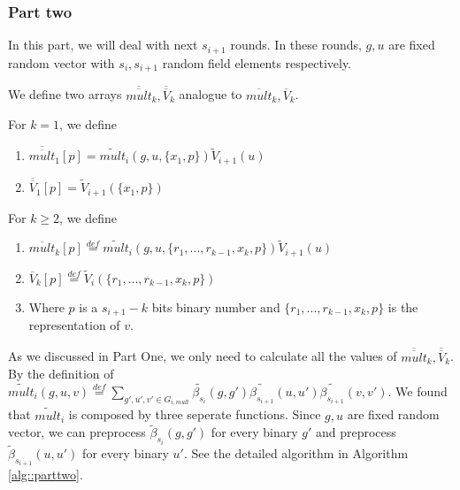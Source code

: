 \subsubsection{Part two}
In this part, we will deal with next $s_{i+1}$ rounds. In these rounds, $g, u$ are fixed random vector with $s_{i}, s_{i+1}$ random field elements respectively.

We define two arrays $\overline{\overline{mult}}_k, \overline{\overline{V}}_k$ analogue to $\overline{mult}_k, \overline{V}_k$.

\begin{definition}
	For $k=1$, we define 
	\begin{enumerate}
		\item $\overline{\overline{mult}}_1[p] = \tilde{mult}_i(g, u, \{x_1, p\})\tilde{V}_{i+1}(u)$
		\item $\overline{\overline{V}}_1[p] = \tilde{V}_{i+1}(\{x_1, p\})$
	\end{enumerate}
	For $k\ge 2$, we define
	\begin{enumerate}
		\item $\overline{mult}_k[p]\overset{def}{=}\tilde{mult}_i(g, u, \{r_1, ..., r_{k-1}, x_k, p\})\tilde{V}_{i+1}(u)$
		\item $\overline{V}_k[p]\overset{def}{=}\tilde{V}_i(\{r_1, ..., r_{k-1}, x_k, p\})$
		\item Where $p$ is a $s_{i+1}-k$ bits binary number and $\{r_1, ..., r_{k-1}, x_k, p\}$ is the representation of $v$.
	\end{enumerate}
\end{definition}

As we discussed in Part One, we only need to calculate all the values of $\overline{\overline{mult}}_k, \overline{\overline{V}}_k$. By the definition of $\tilde{mult}_i(g, u, v)\overset{def}{=}\sum_{g', u', v' \in G_{i, mult}}\tilde{\beta_{s_i}}(g, g')\tilde{\beta_{s_{i+1}}}(u, u')\tilde{\beta_{s_{i+1}}}(v, v')$. We found that $\tilde{mult}_i$ is composed by three seperate functions. Since $g, u$ are fixed random vector, we can preprocess $\tilde{\beta}_{s_i}(g, g')$ for every binary $g'$ and preprocess $\tilde{\beta}_{s_{i+1}}(u, u')$ for every binary $u'$. See the detailed algorithm in Algorithm \ref{alg::parttwo}.

